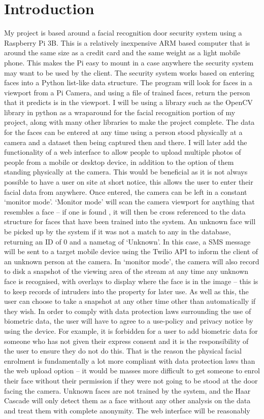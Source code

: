 \documentclass[9pt]{article}
\begin{document}
\section{Introduction}\label{sec_introduction}
My project is based around a facial recognition door security system using a Raspberry Pi 3B. This is a relatively inexpensive ARM based computer that is around the same size as a credit card and the same weight as a light mobile phone. This makes the Pi easy to mount in a case anywhere the security system may want to be used by the client. The security system works based on entering faces into a Python list-like data structure. The program will look for faces in a viewport from a Pi Camera, and using a file of trained faces, return the person that it predicts is in the viewport. I will be using a library such as the OpenCV library in python as a wraparound for the facial recognition portion of my project, along with many other libraries to make the project complete. The data for the faces can be entered at any time using a person stood physically at a camera and a dataset then being captured then and there. I will later add the functionality of a web interface to allow people to upload multiple photos of people from a mobile or desktop device, in addition to the option of them standing physically at the camera. This would be beneficial as it is not always possible to have a user on site at short notice, this allows the user to enter their facial data from anywhere. Once entered, the camera can be left in a constant ‘monitor mode’. ‘Monitor mode’ will scan the camera viewport for anything that resembles a face – if one is found , it will then be cross referenced to the data structure for faces that have been trained into the system. An unknown face will be picked up by the system if it was not a match to any in the database, returning an ID of 0 and a nametag of ‘Unknown’. In this case, a SMS message will be sent to a target mobile device using the Twilio API to inform the client of an unknown person at the camera. In ‘monitor mode’, the camera will also record to disk a snapshot of the viewing area of the stream at any time any unknown face is recognised, with overlays to display where the face is in the image – this is to keep records of intruders into the property for later use. As well as this, the user can choose to take a snapshot at any other time other than automatically if they wish. In order to comply with data protection laws surrounding the use of biometric data, the user will have to agree to a use-policy and privacy notice by using the device. For example, it is forbidden for a user to add biometric data for someone who has not given their express consent and it is the responsibility of the user to ensure they do not do this. That is the reason the physical facial enrolment is fundamentally a lot more compliant with data protection laws than the web upload option – it would be masses more difficult to get someone to enrol their face without their permission if they were not going to be stood at the door facing the camera. Unknown faces are not trained by the system, and the Haar Cascade will only detect them as a face without any other analysis on the data and treat them with complete anonymity. The web interface will be reasonably 
\end{document}
